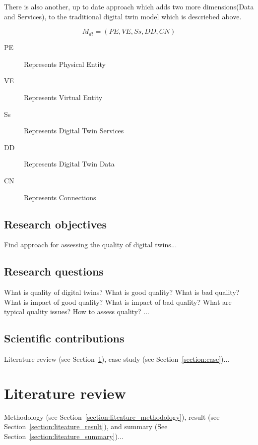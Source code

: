 \documentclass[9pt,conference]{IEEEtran}
\begin{document}
    There is also another, up to date approach which adds two more dimensions(Data and Services), to the traditional digital twin model which is descriebed above.~\cite{article}

    \begin{equation}
        M_{dt} = (PE,VE,Ss,DD,CN)
    \end{equation}
    \begin{description}
        \item[PE] Represents Physical Entity
        \item[VE] Represents Virtual Entity
        \item[Ss] Represents Digital Twin Services
        \item[DD] Represents Digital Twin Data
        \item[CN] Represents Connections
        \end{description}
    

    \subsection{Research objectives}

    Find approach for assessing the quality of digital twins...

    \subsection{Research questions}

    What is quality of digital twins? What is good quality? What is bad quality? What is impact of good quality? What is impact of bad quality? What are typical quality issues? How to assess quality? ...

    \subsection{Scientific contributions}

    Literature review (see Section~\ref{section:literature}), case study (see Section~\ref{section:case})...
    
    \section{Literature review}
    \label{section:literature}

    Methodology (see Section~\ref{section:liteature_methodology}), result (see Section~\ref{section:liteature_result}), and summary (See Section~\ref{section:liteature_summary})...
\end{document}

